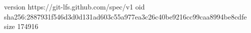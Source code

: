 version https://git-lfs.github.com/spec/v1
oid sha256:2887931f546d3d0d131ad603c55a977ea3c26c40be9216cc99caa8994be8cdfe
size 174916
